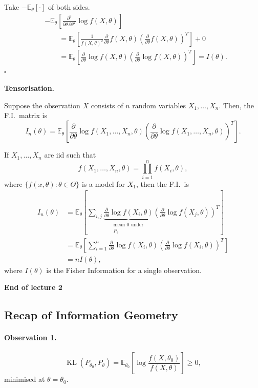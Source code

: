 \documentclass[11pt,a4paper]{article}
\begin{document}
Take $-\mathbb{E}_{\theta}[\cdot]$ of both sides.
\[
\begin{aligned}
&-\mathbb{E}_{\theta}
\left[
\frac{\partial^2}{\partial\theta\,\partial\theta^T}
\log f(X,\theta)
\right]
\\
&\qquad=
\mathbb{E}_{\theta}
\left[
\frac{1}{f(X,\theta)^2}
\frac{\partial}{\partial\theta}f(X,\theta)
\left(
\frac{\partial}{\partial\theta}f(X,\theta)
\right)^T
\right]
+0
\\
&\qquad=
\mathbb{E}_{\theta}
\left[
\frac{\partial}{\partial\theta}\log f(X,\theta)
\left(
\frac{\partial}{\partial\theta}\log f(X,\theta)
\right)^T
\right]
=
I(\theta).
\end{aligned}
\]
\hfill$\square$

\medskip
\noindent\textbf{Tensorisation.}

Suppose the observation $X$ consists of $n$ random variables
$X_1,\ldots,X_n$. Then, the F.I.\ matrix is
\[
I_n(\theta)
=
\mathbb{E}_{\theta}
\left[
\frac{\partial}{\partial\theta}
\log f(X_1,\ldots,X_n,\theta)
\left(
\frac{\partial}{\partial\theta}
\log f(X_1,\ldots,X_n,\theta)
\right)^T
\right].
\]

If $X_1,\ldots,X_n$ are iid such that
\[
f(X_1,\ldots,X_n,\theta)
=
\prod_{i=1}^{n}f(X_i,\theta),
\]
where $\{f(x,\theta):\theta\in\Theta\}$ is a model for $X_1$,
then the F.I.\ is
\[
\begin{aligned}
I_n(\theta)
&=
\mathbb{E}_{\theta}
\left[
\sum_{i,j}
\underbrace{
\frac{\partial}{\partial\theta}\log f(X_i,\theta)
}_{\substack{\text{mean }0\text{ under}\\P_\theta}}
\left(
\frac{\partial}{\partial\theta}\log f(X_j,\theta)
\right)^T
\right]
\\
&=
\mathbb{E}_{\theta}
\left[
\sum_{i=1}^{n}
\frac{\partial}{\partial\theta}\log f(X_i,\theta)
\left(
\frac{\partial}{\partial\theta}\log f(X_i,\theta)
\right)^T
\right]
\\
&=
nI(\theta),
\end{aligned}
\]
where $I(\theta)$ is the Fisher Information for a single observation.

\begin{center}
\textbf{End of lecture 2}
\end{center}

\subsection*{Recap of Information Geometry}

\paragraph{Observation 1.}
\[
\operatorname{KL}(P_{\theta_0},P_\theta)
=
\mathbb{E}_{\theta_0}
\left[
\log\frac{f(X,\theta_0)}{f(X,\theta)}
\right]
\geq 0,
\]
minimised at $\theta=\theta_0$.
\end{document}
